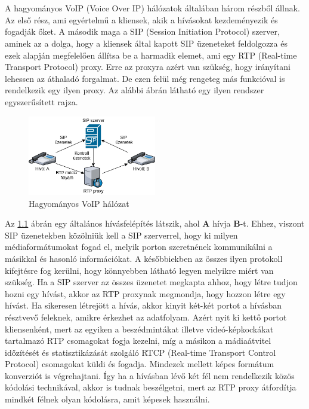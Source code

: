 \chapter{\bevezetes}
A hagyományos VoIP (Voice Over IP) hálózatok általában három részből állnak.
Az első rész, ami egyértelmű a kliensek, akik a hívásokat kezdeményezik és 
fogadják őket. A második maga a SIP (Session Initiation Protocol) szerver, aminek
az a dolga, hogy a kliensek által kapott SIP üzeneteket feldolgozza és ezek alapján
megfelelően állítsa be a harmadik elemet, ami egy RTP (Real-time Transport Protocol) 
proxy. Erre az proxyra azért van szükség, hogy irányítani lehessen az áthaladó 
forgalmat. De ezen felül még rengeteg más funkcióval is rendelkezik egy ilyen
proxy. Az alábbi ábrán látható egy ilyen rendszer egyszerűsített rajza.

\begin{figure}[!ht]
	\centering
	\includegraphics[width=0.5\textwidth, keepaspectratio]{figures/traditional_voip.png}
	\caption{Hagyományos VoIP hálózat}
	\label{fig:tradVoIP}
\end{figure}

Az \ref{fig:tradVoIP} ábrán egy általános hívásfelépítés látszik, ahol \textbf{A} hívja 
\textbf{B}-t. 
Ehhez, viszont SIP üzenetekben közölniük kell a SIP szerverrel, hogy ki milyen 
médiaformátumokat fogad el, melyik porton szeretnének kommunikálni a másikkal és 
hasonló információkat. A későbbiekben az összes ilyen protokoll kifejtésre fog
kerülni, hogy könnyebben látható legyen melyikre miért van szükség. Ha a SIP szerver
az összes üzenetet megkapta ahhoz, hogy létre tudjon hozni egy hívást, akkor az 
RTP proxynak megmondja, hogy hozzon létre egy hívást. Ha sikeresen létrejött a 
hívás, akkor kinyit két-két portot a hívásban résztvevő feleknek, amikre érkezhet
az adatfolyam. Azért nyit ki kettő portot kliensenként, mert az egyiken a
beszédmintákat illetve videó-képkockákat tartalmazó RTP csomagokat fogja
kezelni, míg a másikon a mádiaátvitel időzítését és statisztikázását szolgáló
RTCP (Real-time Transport Control Protocol) csomagokat küldi és fogadja. Mindezek mellett 
képes formátum konverziót is végrehajtani. Így ha a hívásban lévő két fél nem rendelkezik 
közös kódolási technikával, akkor is tudnak beszélgetni, mert az RTP proxy átfordítja 
mindkét félnek olyan kódolásra, amit képesek használni.


